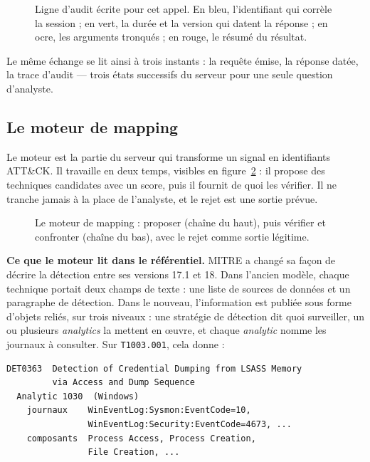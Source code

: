 \begin{figure}[htbp]
\centering
{}
\caption{Ligne d'audit écrite pour cet appel. En bleu, l'identifiant qui corrèle la session ; en vert, la durée et la version qui datent la réponse ; en ocre, les arguments tronqués ; en rouge, le résumé du résultat.}\label{fig:ch2-audit}
\end{figure}

Le même échange se lit ainsi à trois instants : la requête émise, la réponse datée, la trace d'audit --- trois états successifs du serveur pour une seule question d'analyste.

\subsection{Le moteur de mapping}\label{sec:ch2-2-4}

Le moteur est la partie du serveur qui transforme un signal en identifiants ATT\&CK. Il travaille en deux temps, visibles en figure~\ref{fig:ch2-moteur} : il propose des techniques candidates avec un score, puis il fournit de quoi les vérifier. Il ne tranche jamais à la place de l'analyste, et le rejet est une sortie prévue.

\begin{figure}[htbp]
\centering
{}
\caption{Le moteur de mapping : proposer (chaîne du haut), puis vérifier et confronter (chaîne du bas), avec le rejet comme sortie légitime.}\label{fig:ch2-moteur}
\end{figure}

\textbf{Ce que le moteur lit dans le référentiel.} MITRE a changé sa façon de décrire la détection entre ses versions 17.1 et 18. Dans l'ancien modèle, chaque technique portait deux champs de texte : une liste de sources de données et un paragraphe de détection. Dans le nouveau, l'information est publiée sous forme d'objets reliés, sur trois niveaux : une stratégie de détection dit quoi surveiller, un ou plusieurs \emph{analytics} la mettent en œuvre, et chaque \emph{analytic} nomme les journaux à consulter. Sur \texttt{T1003.001}, cela donne :

\begin{verbatim}
DET0363  Detection of Credential Dumping from LSASS Memory
         via Access and Dump Sequence
  Analytic 1030  (Windows)
    journaux    WinEventLog:Sysmon:EventCode=10,
                WinEventLog:Security:EventCode=4673, ...
    composants  Process Access, Process Creation,
                File Creation, ...
\end{verbatim}

